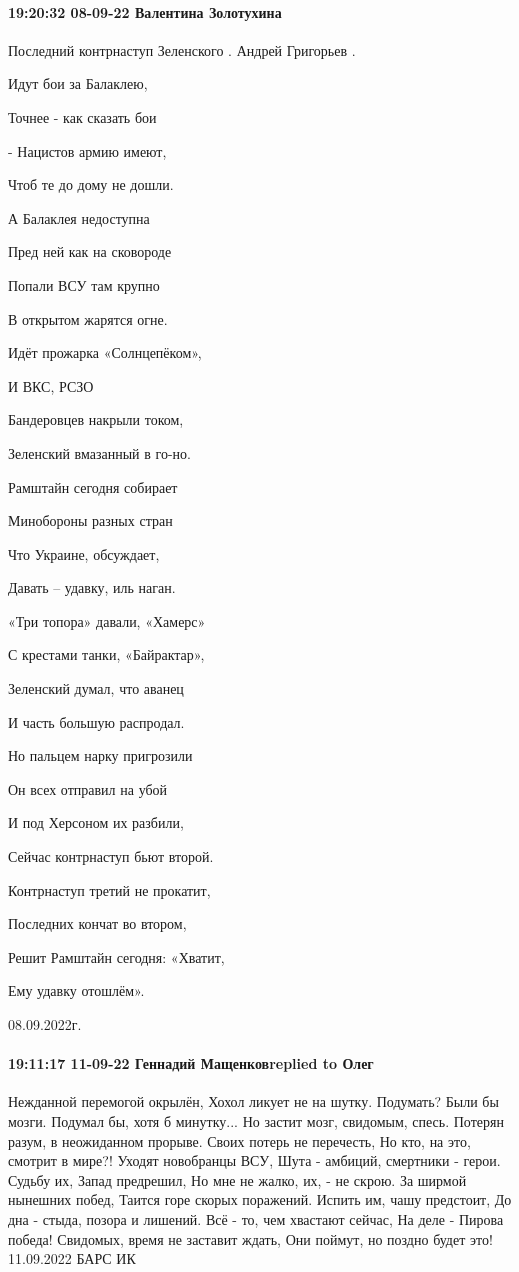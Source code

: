 \paragraph{19:20:32 08-09-22 Валентина Золотухина}

Последний контрнаступ Зеленского . Андрей Григорьев .

Идут бои за Балаклею,

Точнее - как сказать бои

- Нацистов армию имеют,

Чтоб те до дому не дошли.

А Балаклея недоступна

Пред ней как на сковороде

Попали ВСУ там крупно

В открытом жарятся огне.

Идёт прожарка «Солнцепёком»,

И ВКС, РСЗО

Бандеровцев накрыли током,

Зеленский вмазанный в го-но.

Рамштайн сегодня собирает

Минобороны разных стран

Что Украине, обсуждает,

Давать – удавку, иль наган.

«Три топора» давали, «Хамерс»

С крестами танки, «Байрактар»,

Зеленский думал, что аванец

И часть большую распродал.

Но пальцем нарку пригрозили

Он всех отправил на убой

И под Херсоном их разбили,

Сейчас контрнаступ бьют второй.

Контрнаступ третий не прокатит,

Последних кончат во втором,

Решит Рамштайн сегодня: «Хватит,

Ему удавку отошлём».

08.09.2022г.


\paragraph{19:11:17 11-09-22 Геннадий Мащенковreplied to Олег}

Нежданной перемогой окрылён,
Хохол ликует не на шутку.
Подумать? Были бы мозги.
Подумал бы, хотя б минутку...
Но застит мозг, свидомым, спесь.
Потерян разум, в неожиданном прорыве.
Своих потерь не перечесть,
Но кто, на это, смотрит в мире?!
Уходят новобранцы ВСУ,
Шута - амбиций, смертники - герои.
Судьбу их, Запад предрешил,
Но мне не жалко, их, - не скрою.
За ширмой нынешних побед,
Таится горе скорых поражений.
Испить им, чашу предстоит,
До дна - стыда, позора и лишений.
Всё - то, чем хвастают сейчас,
На деле - Пирова победа!
Свидомых, время не заставит ждать,
Они поймут, но поздно будет это!
11.09.2022 БАРС ИК

